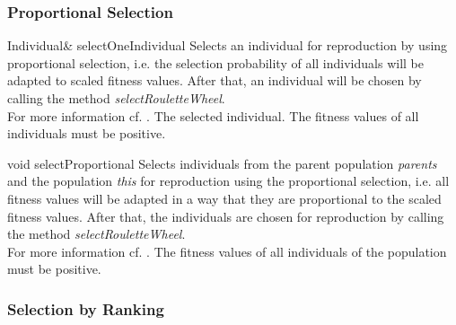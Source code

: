 \subsubsection{Proportional Selection}

\setNormalInstance
\printEmptyMethodReturnSpecial
{Individual\&}
{selectOneIndividual}
{Selects an individual for reproduction by using proportional
 selection, i.e. the selection probability of all
 individuals will be adapted to scaled fitness values. After that,
 an individual will be chosen by calling the method
 {\em selectRouletteWheel}.\\
 For more information cf. \cite{EALibRef}.}
{The selected individual.}
{The fitness values of all individuals must be positive.}

\clearpage

\setNormalInstance
\setCorrectWidthThree{8pt}
\printMethodWithParamsSaved
{void}
{}
{selectProportional}
{Selects individuals from the parent population {\em parents} and
 the population {\em this} for reproduction using the proportional
 selection, i.e. all fitness values will be adapted in a way
 that they are proportional to the scaled fitness values. After that, the
 individuals are chosen for reproduction by calling the method
 {\em selectRouletteWheel}.\\
 For more information cf. \cite{EALibRef}.}
{The fitness values of all individuals of the population must be
 positive.}
\setCorrectWidthThree{4pt}

\subsubsection{Selection by Ranking}

